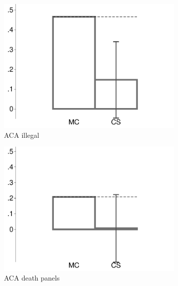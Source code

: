 \begin{figure}[t]
\begin{subfigure}{.325\textwidth}
		\includegraphics[width=\textwidth]{../figs/confidence_score_ccd_cud_rw_illegal_study1.pdf}
		\caption{ACA illegal}
	\end{subfigure}	
	\begin{subfigure}{.325\textwidth}\centering
		\includegraphics[width=\textwidth]{../figs/confidence_score_ccd_cud_rw_death_study1.pdf}
		\caption{ACA death panels}
	\end{subfigure}
	\hfill
	\begin{subfigure}{.325\textwidth}\centering

\end{subfigure}
\end{figure}
